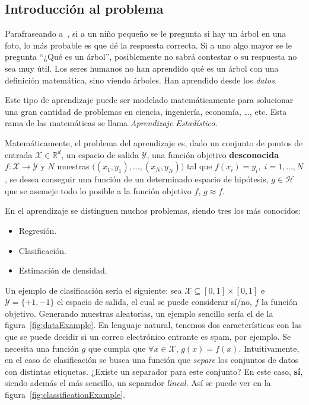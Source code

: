\documentclass[a4paper,11pt]{book}\usepackage[]{graphicx}\usepackage[]{color}
\begin{document}
\subsection{Introducción al problema}

Parafraseando a~\cite{Abu-Mostafa:2012:LD:2207825}, si a un niño pequeño se le pregunta si hay un árbol
en una foto, lo más probable es que dé la respuesta correcta. Si a uno algo mayor
se le pregunta ``¿Qué es un árbol'', posiblemente no sabrá contestar o su respuesta
no sea muy útil. Los seres humanos no han aprendido qué es un árbol con una definición
matemática, sino viendo árboles. Han aprendido desde los \emph{datos}.

Este tipo de aprendizaje puede ser modelado matemáticamente para solucionar una gran
cantidad de problemas en ciencia, ingeniería, economía, \ldots, etc. Esta rama de
las matemáticas se llama \emph{Aprendizaje Estadístico}.

Matemáticamente, el problema del aprendizaje es, dado un conjunto de puntos de entrada
$\mathcal{X} \in \mathbb{R}^d$, un espacio de salida $\mathcal{Y}$, una función objetivo
\textbf{desconocida}$f:\mathcal{X} \rightarrow \mathcal{Y}$ y $N$ muestras
$\big((x_1,y_1),\ldots,(x_N,y_N) \big)$
tal que $f(x_i) = y_i, \; i = 1,\ldots,N$,
se desea conseguir una función de un determinado espacio de hipótesis,
$g \in \mathcal{H}$ que se asemeje todo lo posible a la función objetivo
$f$, $g \approx f$.


En el aprendizaje se distinguen muchos problemas, siendo tres los más conocidos:
\begin{itemize}
  \item Regresión.
  \item Clasificación.
  \item Estimación de densidad.
\end{itemize}

Un ejemplo de clasificación sería el siguiente:
sea $\mathcal{X} \subseteq [0,1] \times [0,1]$ e $\mathcal{Y} = \{+1,-1\}$ el espacio
de salida, el cual se puede considerar sí/no, $f$ la función objetivo.
Generando muestras aleatorias, un ejemplo sencillo sería el de la
figura~\ref{fig:dataExample}. En lenguaje natural, tenemos dos características
con las que se puede decidir si un correo electrónico entrante es spam, por ejemplo.
Se necesita una función $g$ que cumpla que $\forall x \in \mathcal{X}$, $g(x) = f(x)$.
Intuitivamente, en el caso de clasificación se busca una función que \emph{separe}
los conjuntos de datos con distintas etiquetas. ¿Existe un separador para este conjunto?
En este caso, \textbf{sí}, siendo además el más sencillo, un separador \emph{lineal}.
Así se puede ver en la figura~\ref{fig:classificationExample}.
\end{document}
